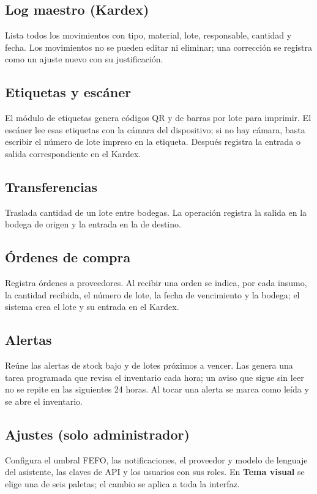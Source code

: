 \subsection*{Log maestro (Kardex)}
Lista todos los movimientos con tipo, material, lote, responsable, cantidad y fecha. Los movimientos no se pueden editar ni eliminar; una corrección se registra como un ajuste nuevo con su justificación.

\subsection*{Etiquetas y escáner}
El módulo de etiquetas genera códigos QR y de barras por lote para imprimir. El escáner lee esas etiquetas con la cámara del dispositivo; si no hay cámara, basta escribir el número de lote impreso en la etiqueta. Después registra la entrada o salida correspondiente en el Kardex.

\subsection*{Transferencias}
Traslada cantidad de un lote entre bodegas. La operación registra la salida en la bodega de origen y la entrada en la de destino.

\subsection*{Órdenes de compra}
Registra órdenes a proveedores. Al recibir una orden se indica, por cada insumo, la cantidad recibida, el número de lote, la fecha de vencimiento y la bodega; el sistema crea el lote y su entrada en el Kardex.

\subsection*{Alertas}
Reúne las alertas de stock bajo y de lotes próximos a vencer. Las genera una tarea programada que revisa el inventario cada hora; un aviso que sigue sin leer no se repite en las siguientes 24 horas. Al tocar una alerta se marca como leída y se abre el inventario.

\subsection*{Ajustes (solo administrador)}
Configura el umbral FEFO, las notificaciones, el proveedor y modelo de lenguaje del asistente, las claves de API y los usuarios con sus roles. En \textbf{Tema visual} se elige una de seis paletas; el cambio se aplica a toda la interfaz.

